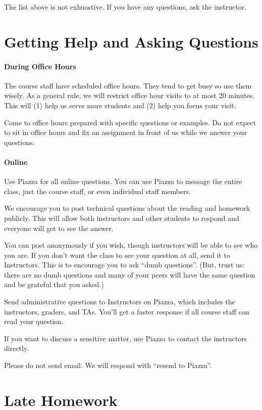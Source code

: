 \documentclass{article}
\begin{document}
The list above is not exhuastive. If you have any questions, ask the instructor.

\section{Getting Help and Asking Questions}

\paragraph{During Office Hours}

The course staff have scheduled office hours. They tend to get busy so use them
wisely. As a general rule, we will restrict office hour visits to at most 20
minutes. This will (1) help us serve more students and (2) help you focus your
visit.

Come to office hours prepared with specific questions or examples. Do not
expect to sit in office hours and fix an assignment in front of us while we
answer your questions.

\paragraph{Online}

Use Piazza for all online questions. You can use Piazza to message the entire
class, just the course staff, or even individual staff members.

We encourage you to post technical questions about the reading and homework
publicly. This will allow both instructors and other students to respond and
everyone will get to see the answer.

You can post anonymously if you wish, though instructors will be able to see
who you are. If you don't want the class to see your question at all, send it
to Instructors. This is to encourage you to ask ``dumb questions''. (But, trust
us: there are no dumb questions and many of your peers will have the same
question and be grateful that you asked.)

Send administrative questions to Instructors on Piazza, which includes the
instructors, graders, and TAs. You’ll get a faster response if all course staff
can read your question.

If you want to discuss a sensitive matter, use Piazza to contact the
instructors directly.

Please do not send email. We will respond with ``resend to Piazza''.

\section{Late Homework}
\end{document}
